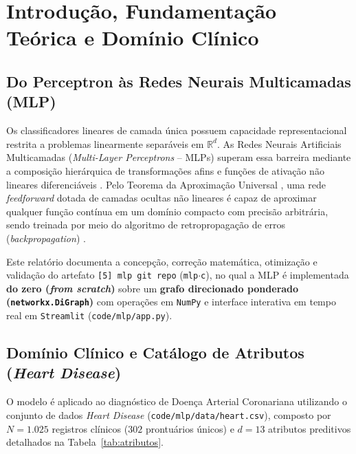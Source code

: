\section{Introdução, Fundamentação Teórica e Domínio Clínico}
\label{sec:introducao}

\subsection{Do Perceptron às Redes Neurais Multicamadas (MLP)}
Os classificadores lineares de camada única possuem capacidade representacional restrita a problemas linearmente separáveis em $\mathbb{R}^d$. As Redes Neurais Artificiais Multicamadas (\textit{Multi-Layer Perceptrons} -- MLPs) superam essa barreira mediante a composição hierárquica de transformações afins e funções de ativação não lineares diferenciáveis \cite{goodfellow2016deep}. Pelo Teorema da Aproximação Universal \cite{cybenko1989approximation}, uma rede \textit{feedforward} dotada de camadas ocultas não lineares é capaz de aproximar qualquer função contínua em um domínio compacto com precisão arbitrária, sendo treinada por meio do algoritmo de retropropagação de erros (\textit{backpropagation}) \cite{rumelhart1986learning}.

Este relatório documenta a concepção, correção matemática, otimização e validação do artefato \texttt{[5] mlp git repo} (\texttt{mlp$\cdot$c}), no qual a MLP é implementada \textbf{do zero (\textit{from scratch})} sobre um \textbf{grafo direcionado ponderado (\texttt{networkx.DiGraph})} com operações em \texttt{NumPy} e interface interativa em tempo real em \texttt{Streamlit} (\texttt{code/mlp/app.py}).

\subsection{Domínio Clínico e Catálogo de Atributos (\textit{Heart Disease})}
O modelo é aplicado ao diagnóstico de Doença Arterial Coronariana utilizando o conjunto de dados \textit{Heart Disease} \cite{detrano1989international} (\texttt{code/mlp/data/heart.csv}), composto por $N = 1.025$ registros clínicos ($302$ prontuários únicos) e $d = 13$ atributos preditivos detalhados na Tabela~\ref{tab:atributos}.

